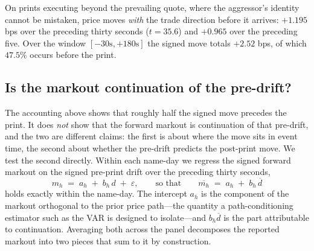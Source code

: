 \documentclass[11pt]{article}
\begin{document}
On prints executing beyond the prevailing quote, where the aggressor's identity cannot be
mistaken, price moves \emph{with} the trade direction before it arrives: $+1.195$ bps over the preceding thirty seconds ($t=35.6$) and
$+0.965$ over the preceding five. Over the window $[-30\text{s},+180\text{s}]$ the signed
move totals $+2.52$ bps, of which $47.5\%$ occurs before the print.

\subsection{Is the markout continuation of the pre-drift?}
\label{sec:decomposition}

The accounting above shows that roughly half the signed move precedes the print. It does
\emph{not} show that the forward markout is continuation of that pre-drift, and the two are
different claims: the first is about where the move sits in event time, the second about
whether the pre-drift predicts the post-print move. We test the second directly. Within each
name-day we regress the signed forward markout on the signed pre-print drift over the
preceding thirty seconds,
\begin{equation}
m_h \;=\; a_h \;+\; b_h\, d \;+\; \varepsilon,
\qquad\text{so that}\qquad
\overline{m_h} \;=\; a_h \;+\; b_h\, \overline{d}
\label{eq:decomp}
\end{equation}
holds exactly within the name-day. The intercept $a_h$ is the component of the markout
orthogonal to the prior price path---the quantity a path-conditioning estimator such as the
VAR is designed to isolate---and $b_h\overline{d}$ is the part attributable to continuation.
Averaging both across the panel decomposes the reported markout into two pieces that sum to
it by construction.
\end{document}
